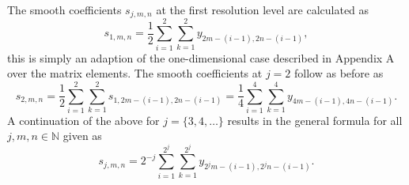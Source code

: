 \documentclass[a4paper, 12pt]{article}
\begin{document}
\noindent
The smooth coefficients $s_{j,m,n}$ at the first resolution level are calculated as
$$s_{1,m,n} = \frac{1}{2} \sum\limits^{2}_{i = 1} \sum\limits^{2}_{k = 1} y_{2m - (i-1), 2n - (i -1)},$$
this is simply an adaption of the one-dimensional case described in Appendix A over the matrix elements.
The smooth coefficients at $j = 2$ follow as before as
$$s_{2,m,n} = \frac{1}{2} \sum\limits^{2}_{i = 1} \sum\limits^{2}_{k=1} s_{1, 2m - (i - 1), 2n - (i - 1)} = \frac{1}{4} \sum\limits^{4}_{i = 1} \sum\limits^{4}_{k = 1} y_{4m - (i-1), 4n - (i - 1)}.$$
A continuation of the above for $j = \{3, 4, \ldots \}$ results in the general formula for all $j, m, n \in \mathbb{N}$ given as
$$s_{j,m,n} = 2^{-j} \sum\limits^{2^{j}}_{i = 1} \sum\limits^{2^{j}}_{k = 1} y_{2^{j}m - (i - 1), 2^{j}n - (i - 1)}.$$
\end{document}
